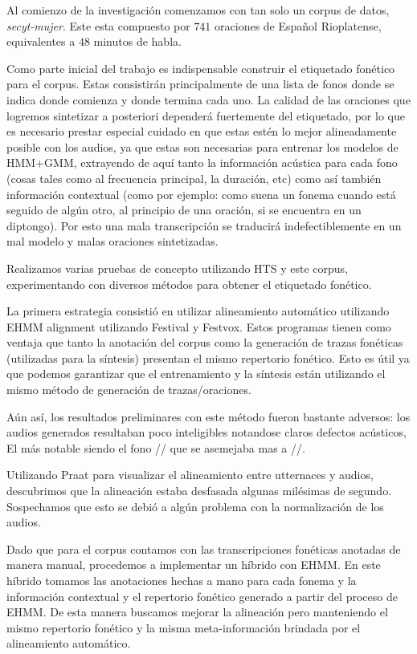 Al comienzo de la investigación comenzamos con tan solo un corpus de datos, \textit{secyt-mujer}\cite{secytMujer}. Este esta compuesto por $741$ oraciones de Español Rioplatense, equivalentes a $48$ minutos de habla. 

Como parte inicial del trabajo es indispensable construir el etiquetado fonético para el corpus. Estas consistirán principalmente de una lista de fonos donde se indica donde comienza y donde termina cada uno. La calidad de las oraciones que logremos sintetizar a posteriori dependerá fuertemente del etiquetado, por lo que es necesario prestar especial cuidado en que estas estén lo mejor alineadamente posible con los audios, ya que estas son necesarias para entrenar los modelos de HMM+GMM, extrayendo de aquí tanto la información acústica para cada fono (cosas tales como al frecuencia principal, la duración, etc) como así también información contextual (como por ejemplo: como suena un fonema cuando está seguido de algún otro, al principio de una oración, si se encuentra en un diptongo). Por esto una mala transcripción se traducirá indefectiblemente en un mal modelo y malas oraciones sintetizadas.


Realizamos varias pruebas de concepto utilizando HTS y este corpus, experimentando con diversos métodos para obtener el etiquetado fonético. 

La primera estrategia consistió en utilizar alineamiento automático utilizando EHMM alignment \cite{phoneticCapturing} utilizando Festival y Festvox. Estos programas tienen como ventaja que tanto la anotación del corpus como la generación de trazas fonéticas (utilizadas para la síntesis) presentan el mismo repertorio fonético. Esto es útil ya que podemos garantizar que el entrenamiento y la síntesis están utilizando el mismo método de generación de trazas/oraciones.

Aún así, los resultados preliminares con este método fueron bastante adversos: los audios generados resultaban poco inteligibles notandose claros defectos acústicos, El más notable siendo el fono // que se asemejaba mas a //.

Utilizando Praat para visualizar el alineamiento entre utternaces y audios, descubrimos que la alineación estaba desfasada algunas milésimas de segundo. Sospechamos que esto se debió a algún problema con la normalización de los audios.

Dado que para el corpus contamos con las transcripciones fonéticas anotadas de manera manual, procedemos a implementar un híbrido con EHMM. En este híbrido tomamos las anotaciones hechas a mano para cada fonema y la información contextual y el repertorio fonético generado a partir del proceso de EHMM. De esta manera buscamos mejorar la alineación pero manteniendo el mismo repertorio fonético y la misma meta-información brindada por el alineamiento automático.

